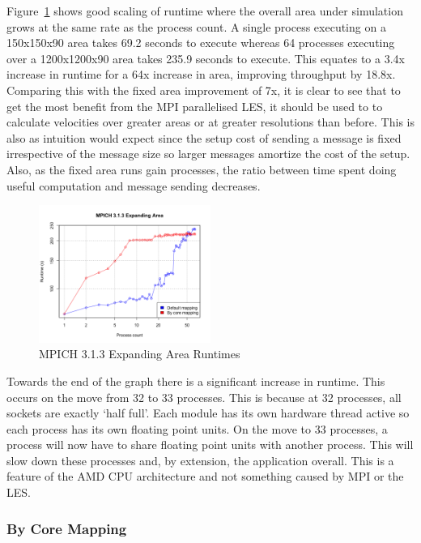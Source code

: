 Figure~\ref{fig:mpichexpandingarea} shows good scaling of runtime where the
overall area under simulation grows at the same rate as the process count. A
single process executing on a 150x150x90 area takes 69.2 seconds to execute
whereas 64 processes executing over a 1200x1200x90 area takes 235.9 seconds to
execute. This equates to a 3.4x increase in runtime for a 64x increase in area,
improving throughput by 18.8x. Comparing this with the fixed area improvement of
7x, it is clear to see that to get the most benefit from the MPI parallelised
LES, it should be used to to calculate velocities over greater areas or at
greater resolutions than before. This is also as intuition would expect since
the setup cost of sending a message is fixed irrespective of the message size so
larger messages amortize the cost of the setup. Also, as the fixed area runs
gain processes, the ratio between time spent doing useful computation and
message sending decreases.

\begin{figure}
    \includegraphics[width=0.5\textwidth]{graphs/MPICH313-expanding-area.png}
    \caption{MPICH 3.1.3 Expanding Area Runtimes}
    \label{fig:mpichexpandingarea}
\end{figure}

Towards the end of the graph there is a significant increase in runtime. This
occurs on the move from 32 to 33 processes. This is because at 32 processes, all
sockets are exactly `half full'. Each module has its own hardware thread active
so each process has its own floating point units. On the move to 33 processes, a
process will now have to share floating point units with another process. This
will slow down these processes and, by extension, the application overall. This
is a feature of the AMD CPU architecture and not something caused by MPI or the
LES.

\subsubsection{By Core Mapping}

